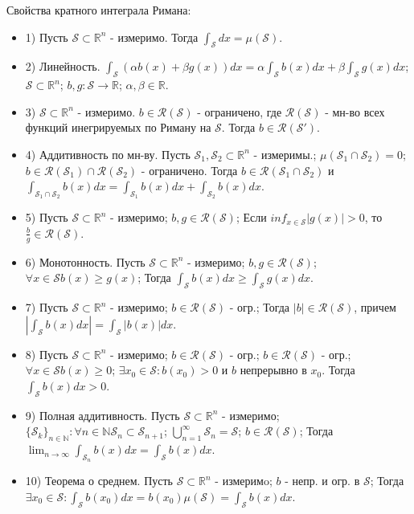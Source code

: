 \documentclass[unicode,10pt, landscape]{article}
\begin{document}
\begin{multicols}{2}
Свойства кратного интеграла Римана:
\begin{itemize}
\item 1) Пусть $\mathcal{S} \subset \mathbb{R}^n$ - измеримо. Тогда $\int_{\mathcal{S}}dx = \mu(\mathcal{S})$.
\item 2) Линейность. $\int_{\mathcal{S}}(\alpha b(x) + \beta g(x))dx = \alpha\int_\mathcal{S}b(x)dx + \beta\int_\mathcal{S}g(x)dx$; $\mathcal{S} \subset \mathbb{R}^n$; $b,g: \mathcal{S} \to \mathbb{R}$; $\alpha, \beta \in \mathbb{R}$.
\item 3) $\mathcal{S} \subset \mathbb{R}^n$ - измеримо. $b \in \mathcal{R}(\mathcal{S})$ - ограничено, где $\mathcal{R}(\mathcal{S})$ - мн-во всех функций инегрируемых по Риману на $\mathcal{S}$. Тогда $b \in \mathcal{R}(\mathcal{S}')$.
\item 4) Аддитивность по мн-ву. Пусть $\mathcal{S}_1, \mathcal{S}_2 \subset \mathbb{R}^n$ - измеримы.; $\mu(\mathcal{S}_1 \cap \mathcal{S}_2) = 0$; $b \in \mathcal{R}(\mathcal{S}_1) \cap \mathcal{R}(\mathcal{S}_2)$ - ограничено. Тогда $b \in \mathcal{R}(\mathcal{S}_1 \cap \mathcal{S}_2)$ и $\int_{\mathcal{S}_1 \cap \mathcal{S}_2}b(x)dx = \int_{\mathcal{S}_1}b(x)dx + \int_{\mathcal{S}_2}b(x)dx$.
\item 5) Пусть $\mathcal{S} \subset \mathbb{R}^n$ - измеримо; $b, g \in \mathcal{R}(\mathcal{S})$; Если $inf_{x \in \mathcal{S}} |g(x)| > 0$, то $\frac{b}{g} \in \mathcal{R}(\mathcal{S})$.
\item 6) Монотонность. Пусть $\mathcal{S} \subset \mathbb{R}^n$ - измеримо; $b, g \in \mathcal{R}(\mathcal{S})$; $\forall x \in \mathcal{S}  b(x) \geq g(x)$; Тогда $\int_\mathcal{S}b(x)dx \geq \int_\mathcal{S}g(x)dx$.
\item 7) Пусть $\mathcal{S} \subset \mathbb{R}^n$ - измеримо; $b \in \mathcal{R}(\mathcal{S})$ - огр.; Тогда $|b| \in \mathcal{R}(\mathcal{S})$, причем $|\int_\mathcal{S}b(x)dx| = \int_\mathcal{S}|b(x)|dx$.
\item 8)  Пусть $\mathcal{S} \subset \mathbb{R}^n$ - измеримо; $b \in \mathcal{R}(\mathcal{S})$ - огр.; $b \in \mathcal{R}(\mathcal{S})$ - огр.; $\forall x \in \mathcal{S}  b(x) \geq 0$; $\exists x_0 \in \mathcal{S}: b(x_0) > 0$ и $b$ непрерывно в $x_0$. Тогда $\int_\mathcal{S}b(x)dx > 0$.
\item 9) Полная аддитивность.  Пусть $\mathcal{S} \subset \mathbb{R}^n$ - измеримо; $\{\mathcal{S}_k\}_{n\in\mathbb{N}} : \forall n \in \mathbb{N} \mathcal{S}_n \subset \mathcal{S}_{n+1}$; $\bigcup_{n=1}^\infty \mathcal{S}_n = \mathcal{S}$; $b \in \mathcal{R}(\mathcal{S})$; Тогда $\lim_{n \to \infty} \int_{\mathcal{S}_n} b(x)dx = \int_{\mathcal{S}} b(x)dx$.
\item 10) Теорема о среднем.  Пусть $\mathcal{S} \subset \mathbb{R}^n$ - измеримo; $b$ - непр. и огр. в $\mathcal{S}$; Тогда $\exists x_0 \in \mathcal{S}: \int_\mathcal{S} b(x_0)dx = b(x_0)\mu(\mathcal{S}) = \int_{\mathcal{S}} b(x)dx$.
\end{itemize}


\end{multicols}
\end{document}

